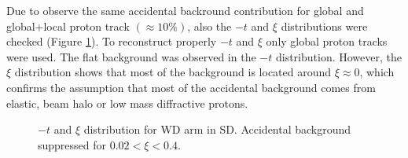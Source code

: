Due to observe the same  accidental backround contribution  for global and global+local proton track $\left(\approx 10\%\right)$, also the $-t$ and $\xi$ distributions were checked (Figure \ref{fig:txiSD}). To reconstruct properly $-t$ and $\xi$ only global proton tracks were used. The flat background was observed in the $-t$ distribution. However, the $\xi$ distribution shows that most of the background is located around $\xi\approx 0$, which confirms the assumption that most of the accidental background comes from elastic, beam halo or low mass diffractive protons.
\begin{figure}[H]
	\centering
	\parbox{0.48\textwidth}{
		\centering
		\begin{subfigure}[b]{\linewidth}{
				}
		\end{subfigure}
	}
	\quad
	\parbox{0.48\textwidth}{
		\centering
		\begin{subfigure}[b]{\linewidth}{
				}
		\end{subfigure}
	}
	\caption[$-t$ and $\xi$ distribution for WD arm in SD]{$-t$ and $\xi$ distribution for WD arm in SD. Accidental background suppressed for $0.02<\xi<0.4$.}
	 \label{fig:txiSD}
\end{figure}

